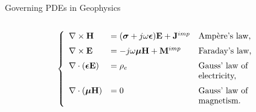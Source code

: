 \begin{frame}{Governing PDEs in Geophysics}
\begin{columns}
\begin{column}{0.55\textwidth}
\vspace{0,15cm}
\begin{equation}
\notag
\left\{
                \begin{array}{lll}
                \vspace{0,2cm}
                  \mathbf{\nabla} \times \mathbf{H} & = (\boldsymbol{\sigma} + j \omega \boldsymbol{\epsilon})\mathbf{E} + \mathbf{J}^{imp} & \textup{Ampère's law,}\\
                  \vspace{0,2cm}
                  \mathbf{\nabla} \times \mathbf{E} & = -j \omega \boldsymbol{\mu}\mathbf{H} + \mathbf{M}^{imp} & \textup{Faraday's law,}\\
                  \mathbf{\nabla} \cdot (\boldsymbol{\epsilon}\mathbf{E}) & = \rho_{e} & \textup{Gauss' law of} \\
                  \vspace{0,2cm}
                  & & \textup{electricity,} \\
                  \mathbf{\nabla} \cdot (\boldsymbol{\mu}\mathbf{H}) & =0 & \textup{Gauss' law of} \\
                 & & \textup{magnetism.}
                \end{array}
              \right.
\end{equation}
\end{column}
\end{columns}
\end{frame}


